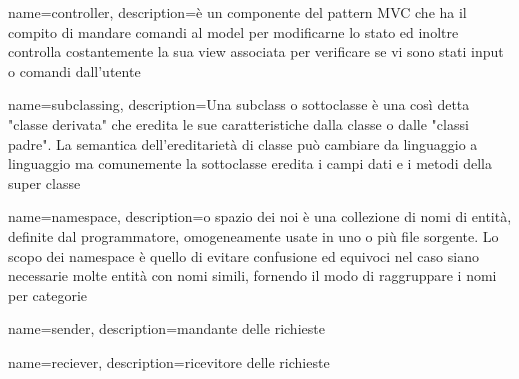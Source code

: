  {
	name=controller,
	description={è un componente del pattern MVC che ha il compito di mandare comandi al model per modificarne lo stato ed inoltre controlla costantemente la sua view associata per verificare se vi sono stati input o comandi dall'utente}
}

 {
	name=subclassing,
	description={Una subclass o sottoclasse è una così detta "classe derivata" che eredita le sue caratteristiche dalla classe o dalle "classi padre". La semantica dell'ereditarietà di classe può cambiare da linguaggio a linguaggio ma comunemente la sottoclasse eredita i campi dati e i metodi della super classe }
}

 {
	name=namespace,
	description={o spazio dei noi è una collezione di nomi di entità, definite dal programmatore, omogeneamente usate in uno o più file sorgente. Lo scopo dei namespace è quello di evitare confusione ed equivoci nel caso siano necessarie molte entità con nomi simili, fornendo il modo di raggruppare i nomi per categorie}
}

 {
	name=sender,
	description={mandante delle richieste}
}

 {
	name=reciever,
		description={ricevitore delle richieste}
}

